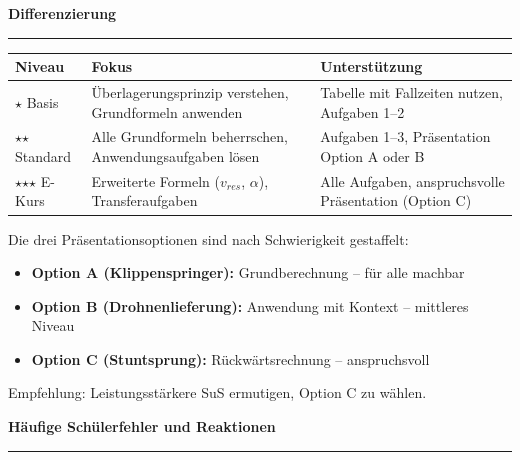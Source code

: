 \documentclass[11pt, a4paper]{article}
\newcommand{\stmark}{$\star$}
\newcommand{\fachfarbe}{physik}
\newcommand{\abschnitt}[1]{%
    \vspace{12pt}
    \noindent\textbf{\large\textcolor{\fachfarbe}{#1}}
    \vspace{6pt}
    \hrule
    \vspace{8pt}
}
\begin{document}

\abschnitt{Differenzierung}

\begin{tabular}{|p{2.5cm}|p{5cm}|p{6cm}|}
\hline
\textbf{Niveau} & \textbf{Fokus} & \textbf{Unterstützung} \\
\hline
\stmark{} Basis & Überlagerungsprinzip verstehen, Grundformeln anwenden & Tabelle mit Fallzeiten nutzen, Aufgaben 1--2 \\
\hline
\stmark\stmark{} Standard & Alle Grundformeln beherrschen, Anwendungsaufgaben lösen & Aufgaben 1--3, Präsentation Option A oder B \\
\hline
\stmark\stmark\stmark{} E-Kurs & Erweiterte Formeln ($v_{res}$, $\alpha$), Transferaufgaben & Alle Aufgaben, anspruchsvolle Präsentation (Option C) \\
\hline
\end{tabular}

\vspace{8pt}

\begin{warnbox}
Die drei Präsentationsoptionen sind nach Schwierigkeit gestaffelt:
\begin{itemize}
    \item \textbf{Option A (Klippenspringer):} Grundberechnung -- für alle machbar
    \item \textbf{Option B (Drohnenlieferung):} Anwendung mit Kontext -- mittleres Niveau
    \item \textbf{Option C (Stuntsprung):} Rückwärtsrechnung -- anspruchsvoll
\end{itemize}
Empfehlung: Leistungsstärkere SuS ermutigen, Option C zu wählen.
\end{warnbox}


\abschnitt{Häufige Schülerfehler und Reaktionen}
\end{document}
